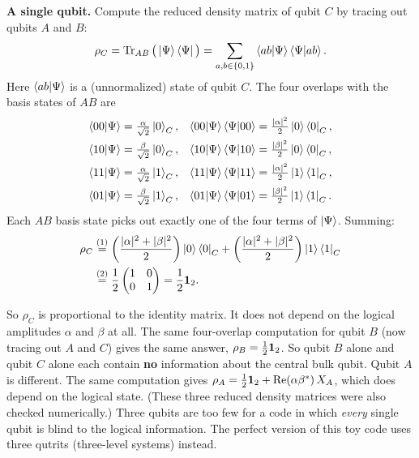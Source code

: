 \textbf{A single qubit.} Compute the reduced density matrix of qubit $C$ by tracing out qubits $A$ and $B$:
\[
\rho_C = \operatorname{Tr}_{AB}\big(\ket{\Psi}\bra{\Psi}\big) = \sum_{a,b \in \{0,1\}} \braket{ab|\Psi}\braket{\Psi|ab} .
\]
Here $\braket{ab|\Psi}$ is a (unnormalized) state of qubit $C$. The four overlaps with the basis states of
$AB$ are
\begin{align*}
\braket{00|\Psi} &= \tfrac{\alpha}{\sqrt{2}}\ket{0}_C , &
\braket{00|\Psi}\braket{\Psi|00} &= \tfrac{|\alpha|^2}{2}\ket{0}\bra{0}_C , \\
\braket{10|\Psi} &= \tfrac{\beta}{\sqrt{2}}\ket{0}_C , &
\braket{10|\Psi}\braket{\Psi|10} &= \tfrac{|\beta|^2}{2}\ket{0}\bra{0}_C , \\
\braket{11|\Psi} &= \tfrac{\alpha}{\sqrt{2}}\ket{1}_C , &
\braket{11|\Psi}\braket{\Psi|11} &= \tfrac{|\alpha|^2}{2}\ket{1}\bra{1}_C , \\
\braket{01|\Psi} &= \tfrac{\beta}{\sqrt{2}}\ket{1}_C , &
\braket{01|\Psi}\braket{\Psi|01} &= \tfrac{|\beta|^2}{2}\ket{1}\bra{1}_C .
\end{align*}
Each $AB$ basis state picks out exactly one of the four terms of $\ket\Psi$. Summing:
\begin{align}
\rho_C &\overset{(1)}{=} \left(\frac{|\alpha|^2 + |\beta|^2}{2}\right)\ket{0}\bra{0}_C
+ \left(\frac{|\alpha|^2 + |\beta|^2}{2}\right)\ket{1}\bra{1}_C \notag\\
&\overset{(2)}{=} \frac{1}{2}\begin{pmatrix} 1 & 0 \\ 0 & 1 \end{pmatrix} = \frac{1}{2}\mathbf{1}_2 . \notag
\end{align}
\quad
{}

So $\rho_C$ is proportional to the identity matrix. It does not depend on the logical amplitudes $\alpha$ and
$\beta$ at all. The same four-overlap computation for qubit $B$ (now tracing out $A$ and $C$) gives the same
answer, $\rho_B=\tfrac12\mathbf{1}_2$. So qubit $B$ alone and qubit $C$ alone each contain \textbf{no} information
about the central bulk qubit. Qubit $A$ is different. The same computation gives
$\rho_A=\tfrac12\mathbf{1}_2+\operatorname{Re}(\alpha\beta^*)\,X_A$, which does depend on the logical state. (These three reduced
density matrices were also checked numerically.) Three qubits are too few for a code in which \emph{every}
single qubit is blind to the logical information. The perfect version of this toy code uses three qutrits
(three-level systems) instead.

